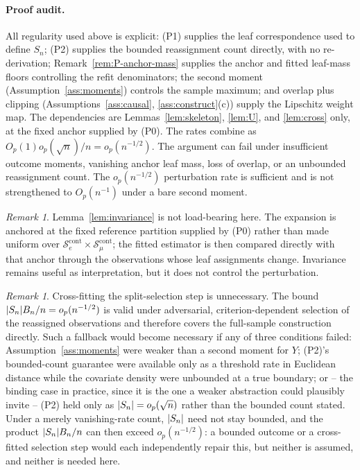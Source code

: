\documentclass[11pt]{article}
\theoremstyle{plain}
\theoremstyle{definition}
\theoremstyle{remark}
\newtheorem{remark}[theorem]{Remark}
\newcommand{\cS}{\mathcal{S}}
\DeclarePairedDelimiter{\card}{\lvert}{\rvert}
\begin{document}
\paragraph{Proof audit.}
All regularity used above is explicit: (P1) supplies the leaf correspondence
used to define $S_n$; (P2) supplies the bounded reassignment count directly,
with no re-derivation; Remark~\ref{rem:P-anchor-mass} supplies the anchor
and fitted leaf-mass floors controlling the refit denominators; the second
moment (Assumption~\ref{ass:moments}) controls the sample maximum; and
overlap plus clipping (Assumptions~\ref{ass:causal},
\ref{ass:construct}(c)) supply the Lipschitz weight map. The dependencies
are Lemmas~\ref{lem:skeleton}, \ref{lem:U}, and \ref{lem:cross} only, at the
fixed anchor supplied by (P0). The rates combine as
$O_p(1)o_p(\sqrt n)/n=o_p(n^{-1/2})$. The argument can fail under insufficient
outcome moments, vanishing anchor leaf mass, loss of overlap, or an unbounded
reassignment count. The $o_p(n^{-1/2})$ perturbation rate is sufficient and
is not strengthened to $O_p(n^{-1})$ under a bare second moment.

\begin{remark}
Lemma~\ref{lem:invariance} is not load-bearing here. The expansion is anchored
at the fixed reference partition supplied by (P0) rather than made uniform over
$\cS_e^{\mathrm{cont}}\times\cS_\mu^{\mathrm{cont}}$; the fitted estimator is
then compared directly with that anchor through the observations whose leaf
assignments change. Invariance remains useful as interpretation, but it does
not control the perturbation.
\end{remark}

\begin{remark}
Cross-fitting the split-selection step is unnecessary. The bound
$\card{S_n}B_n/n=o_p(n^{-1/2})$ is valid under adversarial,
criterion-dependent selection of the reassigned observations and therefore
covers the full-sample construction directly. Such a fallback would become
necessary if any of three conditions failed: Assumption~\ref{ass:moments}
were weaker than a second moment for $Y$; (P2)'s bounded-count guarantee were
available only as a threshold rate in Euclidean distance while the covariate
density were unbounded at a true boundary; or -- the binding case in
practice, since it is the one a weaker abstraction could plausibly invite --
(P2) held only as $\card{S_n}=o_p(\sqrt n)$ rather than the bounded count
stated. Under a merely vanishing-rate count, $\card{S_n}$ need not stay
bounded, and the product $\card{S_n}B_n/n$ can then exceed $o_p(n^{-1/2})$: a
bounded outcome or a cross-fitted selection step would each independently
repair this, but neither is assumed, and neither is needed here.
\end{remark}
\end{document}
